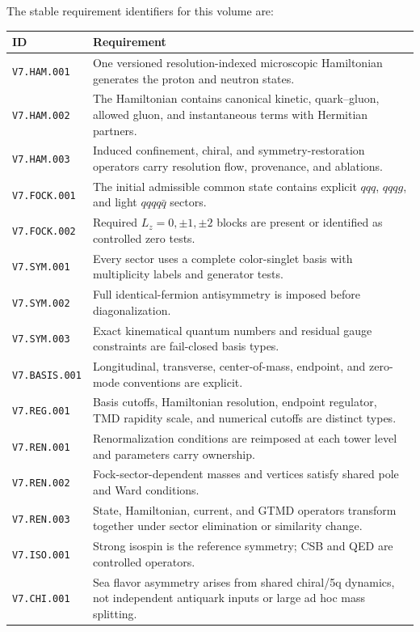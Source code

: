 \documentclass[11pt]{article}
\newcommand{\Lz}{L_z}
\begin{document}
The stable requirement identifiers for this volume are:
\begin{longtable}{L{0.16\textwidth}L{0.75\textwidth}}
\toprule
ID & Requirement\\
\midrule
\endhead
\texttt{V7.HAM.001} & One versioned resolution-indexed microscopic Hamiltonian
generates the proton and neutron states.\\
\texttt{V7.HAM.002} & The Hamiltonian contains canonical kinetic, quark--gluon,
allowed gluon, and instantaneous terms with Hermitian partners.\\
\texttt{V7.HAM.003} & Induced confinement, chiral, and symmetry-restoration
operators carry resolution flow, provenance, and ablations.\\
\texttt{V7.FOCK.001} & The initial admissible common state contains explicit
\(qqq\), \(qqqg\), and light \(qqqq\bar q\) sectors.\\
\texttt{V7.FOCK.002} & Required \(\Lz=0,\pm1,\pm2\) blocks are present or
identified as controlled zero tests.\\
\texttt{V7.SYM.001} & Every sector uses a complete color-singlet basis with
multiplicity labels and generator tests.\\
\texttt{V7.SYM.002} & Full identical-fermion antisymmetry is imposed before
diagonalization.\\
\texttt{V7.SYM.003} & Exact kinematical quantum numbers and residual gauge
constraints are fail-closed basis types.\\
\texttt{V7.BASIS.001} & Longitudinal, transverse, center-of-mass, endpoint, and
zero-mode conventions are explicit.\\
\texttt{V7.REG.001} & Basis cutoffs, Hamiltonian resolution, endpoint regulator,
TMD rapidity scale, and numerical cutoffs are distinct types.\\
\texttt{V7.REN.001} & Renormalization conditions are reimposed at each tower
level and parameters carry ownership.\\
\texttt{V7.REN.002} & Fock-sector-dependent masses and vertices satisfy shared
pole and Ward conditions.\\
\texttt{V7.REN.003} & State, Hamiltonian, current, and GTMD operators transform
together under sector elimination or similarity change.\\
\texttt{V7.ISO.001} & Strong isospin is the reference symmetry; CSB and QED are
controlled operators.\\
\texttt{V7.CHI.001} & Sea flavor asymmetry arises from shared chiral/5q dynamics,
not independent antiquark inputs or large ad hoc mass splitting.\\

\end{longtable}
\end{document}
